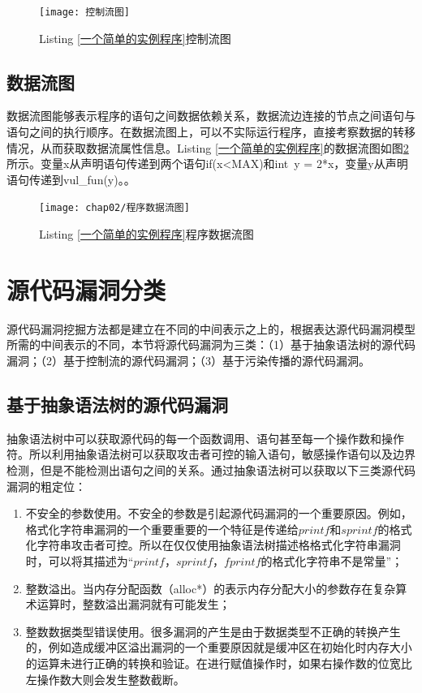 \begin{figure}[htp]
\centering
\texttt{[image: 控制流图]}
\caption{Listing \ref{一个简单的实例程序}控制流图}
\label{控制流图}
\end{figure}

\subsection{数据流图}

数据流图能够表示程序的语句之间数据依赖关系，数据流边连接的节点之间语句与语句之间的执行顺序。在数据流图上，可以不实际运行程序，直接考察数据的转移情况，从而获取数据流属性信息。Listing \ref{一个简单的实例程序}的数据流图如图\ref{程序数据流图}所示。变量x从声明语句传递到两个语句if(x<MAX)和int\ y = 2*x，变量y从声明语句传递到vul\_fun(y)。。

\begin{figure}[htp]
\centering
\texttt{[image: chap02/程序数据流图]}
\caption{Listing \ref{一个简单的实例程序}程序数据流图}
\label{程序数据流图}
\end{figure}

\section{源代码漏洞分类}

源代码漏洞挖掘方法都是建立在不同的中间表示之上的，根据表达源代码漏洞模型所需的中间表示的不同，本节将源代码漏洞为三类：（1）基于抽象语法树的源代码漏洞；（2）基于控制流的源代码漏洞；（3）基于污染传播的源代码漏洞。

\subsection{基于抽象语法树的源代码漏洞}

抽象语法树中可以获取源代码的每一个函数调用、语句甚至每一个操作数和操作符。所以利用抽象语法树可以获取攻击者可控的输入语句，敏感操作语句以及边界检测，但是不能检测出语句之间的关系。通过抽象语法树可以获取以下三类源代码漏洞的粗定位：

\begin{enumerate}[(1)]
\item 不安全的参数使用。不安全的参数是引起源代码漏洞的一个重要原因。例如，格式化字符串漏洞的一个重要重要的一个特征是传递给$printf$和$sprintf$的格式化字符串攻击者可控。所以在仅仅使用抽象语法树描述格格式化字符串漏洞时，可以将其描述为“$printf$，$sprintf$，$fprintf$的格式化字符串不是常量”；
\item 整数溢出。当内存分配函数（alloc*）的表示内存分配大小的参数存在复杂算术运算时，整数溢出漏洞就有可能发生；
\item 整数数据类型错误使用。很多漏洞的产生是由于数据类型不正确的转换产生的，例如造成缓冲区溢出漏洞的一个重要原因就是缓冲区在初始化时内存大小的运算未进行正确的转换和验证。在进行赋值操作时，如果右操作数的位宽比左操作数大则会发生整数截断。
\end{enumerate}


